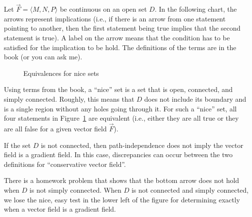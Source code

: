 Let $\vec F=\langle M,N,P\rangle$ be continuous on an open set $D$.  In the
following chart, the arrows represent implications (i.e., if there is
an arrow from one statement pointing to another, then the first
statement being true implies that the second statement is true).  A
label on the arrow means that the condition has to be satisfied for
the implication to be hold.  The definitions of the terms are in the
book (or you can ask me). 
\begin{figure}[H!]
  \centering
  
  \caption{Equivalences for nice sets}
  \label{fig:equivalences}
\end{figure}


Using terms from the book, a ``nice'' set is a set that is open,
connected, and simply connected.  Roughly, this means that $D$ does
not include its boundary and is a single region without any holes going
through it.  For such a ``nice'' set, all four statements in
Figure~\ref{fig:equivalences} are equivalent (i.e., either they are
all true or they are all false for a given vector field $\vec F$).

If the set $D$ is not connected, then path-independence does not imply
the vector field is a gradient field.  In this case, discrepancies can
occur between the two definitions for ``conservative vector field''.

There is a homework problem that shows that the bottom arrow
does not hold when $D$ is not simply connected.  When $D$ is not
connected and simply  connected, we lose the nice, easy test in the
lower left of the figure for determining exactly when a vector field
is a gradient field.













